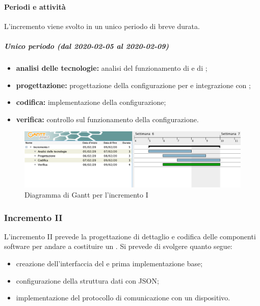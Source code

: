 			\paragraph{Periodi e attività}
			
				L'incremento viene svolto in un unico periodo di breve durata.
				
				\subparagraph{Unico periodo (dal 2020-02-05 al 2020-02-09)}
				
					\begin{itemize}
						\item \textbf{analisi delle tecnologie:} analisi del funzionamento di  e di ;
						\item \textbf{progettazione:} progettazione della configurazione per  e integrazione con ;
						\item \textbf{codifica:} implementazione della configurazione;
						\item \textbf{verifica:} controllo sul funzionamento della configurazione.
					\end{itemize} 			

		\begin{landscape}

          \begin{figure}[H]
            \centering
            \includegraphics[width=\linewidth]{images/gantt/incrementoI} %
            \caption{Diagramma di Gantt per l'incremento I}
          \end{figure}		

		\end{landscape}


		\subsubsection{Incremento II}
			
			L'incremento II prevede la progettazione di dettaglio e codifica delle componenti software per andare a costituire un . Si prevede di svolgere quanto segue:
			\begin{itemize}
				\item creazione dell'interfaccia del  e prima implementazione base;
				\item configurazione della struttura dati con JSON;
				\item implementazione del protocollo di comunicazione con un dispositivo.
			\end{itemize}
			
